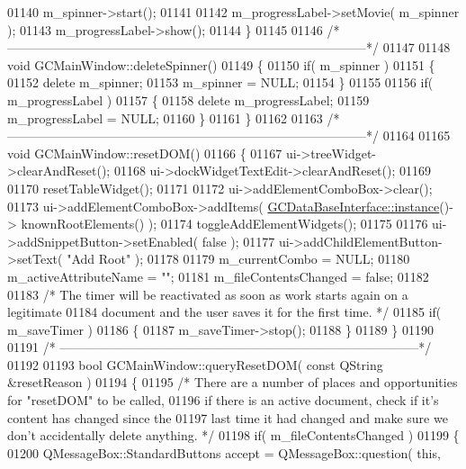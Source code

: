 \begin{DoxyCode}
{{{{{{01140   m\_spinner->start();
01141 
01142   m\_progressLabel->setMovie( m\_spinner );
01143   m\_progressLabel->show();
01144 \}
01145 
01146 \textcolor{comment}{/*
      --------------------------------------------------------------------------------------*/}
01147 
01148 \textcolor{keywordtype}{void} GCMainWindow::deleteSpinner()
01149 \{
01150   \textcolor{keywordflow}{if}( m\_spinner )
01151   \{
01152     \textcolor{keyword}{delete} m\_spinner;
01153     m\_spinner = NULL;
01154   \}
01155 
01156   \textcolor{keywordflow}{if}( m\_progressLabel )
01157   \{
01158     \textcolor{keyword}{delete} m\_progressLabel;
01159     m\_progressLabel = NULL;
01160   \}
01161 \}
01162 
01163 \textcolor{comment}{/*
      --------------------------------------------------------------------------------------*/}
01164 
01165 \textcolor{keywordtype}{void} GCMainWindow::resetDOM()
01166 \{
01167   ui->treeWidget->clearAndReset();
01168   ui->dockWidgetTextEdit->clearAndReset();
01169 
01170   resetTableWidget();
01171 
01172   ui->addElementComboBox->clear();
01173   ui->addElementComboBox->addItems( \hyperlink{class_g_c_data_base_interface_a1baea9c0667aa8b610ec30076fcab84c}{GCDataBaseInterface::instance}()->
      knownRootElements() );
01174   toggleAddElementWidgets();
01175 
01176   ui->addSnippetButton->setEnabled( \textcolor{keyword}{false} );
01177   ui->addChildElementButton->setText( \textcolor{stringliteral}{"Add Root"} );
01178 
01179   m\_currentCombo = NULL;
01180   m\_activeAttributeName = \textcolor{stringliteral}{""};
01181   m\_fileContentsChanged = \textcolor{keyword}{false};
01182 
01183   \textcolor{comment}{/* The timer will be reactivated as soon as work starts again on a legitimate}
01184 \textcolor{comment}{    document and the user saves it for the first time. */}
01185   \textcolor{keywordflow}{if}( m\_saveTimer )
01186   \{
01187     m\_saveTimer->stop();
01188   \}
01189 \}
01190 
01191 \textcolor{comment}{/*
      --------------------------------------------------------------------------------------*/}
01192 
01193 \textcolor{keywordtype}{bool} GCMainWindow::queryResetDOM( \textcolor{keyword}{const} QString &resetReason )
01194 \{
01195   \textcolor{comment}{/* There are a number of places and opportunities for "resetDOM" to be
       called,}
01196 \textcolor{comment}{    if there is an active document, check if it's content has changed since the}
01197 \textcolor{comment}{    last time it had changed and make sure we don't accidentally delete
       anything. */}
01198   \textcolor{keywordflow}{if}( m\_fileContentsChanged )
01199   \{
01200     QMessageBox::StandardButtons accept = QMessageBox::question( \textcolor{keyword}{this},
}}}}}}
\end{DoxyCode}
